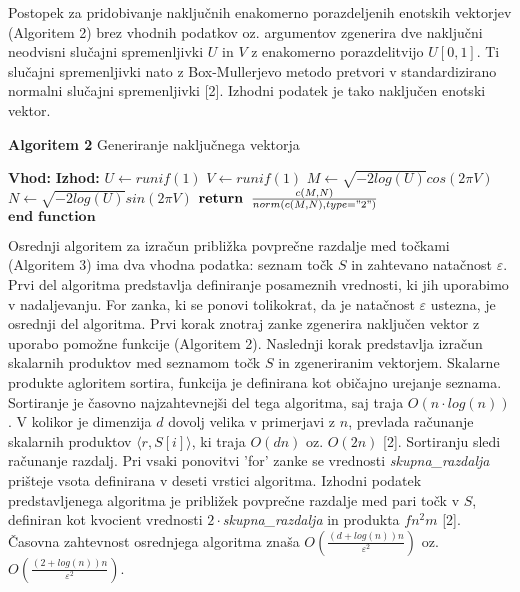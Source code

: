 \documentclass[12pt,a4paper]{amsart}
\theoremstyle{definition} %
\theoremstyle{plain} %
\begin{document}
Postopek za pridobivanje naključnih enakomerno porazdeljenih enotskih vektorjev (Algoritem 2) brez vhodnih podatkov oz. argumentov zgenerira dve naključni neodvisni slučajni spremenljivki $U$ in $V$ z enakomerno porazdelitvijo $U[0,1]$. Ti slučajni spremenljivki nato z Box-Mullerjevo metodo pretvori v standardizirano normalni slučajni spremenljivki [2]. Izhodni podatek je tako naključen enotski vektor. 

\begin{algorithm}[H]
\caption{\textbf{Algoritem 2} Generiranje naključnega vektorja}\label{naključen vektor}
\begin{algorithmic}[1]
\Statex\textbf{Vhod:} \text{--}
\Statex\textbf{Izhod:} 
\State $\textit{U} \gets \textit{runif$(1)$}$
\State $\textit{V} \gets \textit{runif$(1)$}$
\State $\textit{M} \gets \textit{$\sqrt{-2log(U)} cos(2 \pi V)$}$
\State $\textit{N} \gets \textit{$\sqrt{-2log(U)}  sin(2 \pi V)$}$
\State $\textbf{return} \hspace{2mm} \frac{c(M,N)}{norm(c(M,N), type="2")}$ \\
$\textbf{end function}$
\EndFunction
\end{algorithmic}
\end{algorithm}

Osrednji algoritem za izračun približka povprečne razdalje med točkami (Algoritem 3) ima dva vhodna podatka: seznam točk $S$ in zahtevano natačnost $\varepsilon$. Prvi del algoritma predstavlja definiranje posameznih vrednosti, ki jih uporabimo v nadaljevanju. For zanka, ki se ponovi tolikokrat, da je natačnost $\varepsilon$ ustezna, je osrednji del algoritma. Prvi korak znotraj zanke zgenerira naključen vektor z uporabo pomožne funkcije (Algoritem 2). Naslednji korak predstavlja izračun skalarnih produktov med seznamom točk $S$ in zgeneriranim vektorjem. Skalarne produkte agloritem sortira, funkcija  je definirana kot običajno urejanje seznama. Sortiranje je časovno najzahtevnejši del tega algoritma, saj traja $O(n \cdot log(n))$. V kolikor je dimenzija $d$ dovolj velika v primerjavi z $n$, prevlada računanje skalarnih produktov  $\langle r, S[i]\rangle$, ki traja $O(dn)$ oz. $O(2n)$ [2]. Sortiranju sledi računanje razdalj. Pri vsaki ponovitvi 'for' zanke se vrednosti \textit{skupna\_razdalja} prišteje vsota definirana v deseti vrstici algoritma. Izhodni podatek predstavljenega algoritma je približek povprečne razdalje med pari točk v $S$, definiran kot kvocient vrednosti $2 \cdot$\textit{skupna\_razdalja} in produkta $fn^2m$ [2]. Časovna zahtevnost osrednjega algoritma znaša $O(\frac{(d+log(n))n}{\varepsilon^2})$ oz. $O(\frac{(2+log(n))n}{\varepsilon^2})$.
\end{document}
